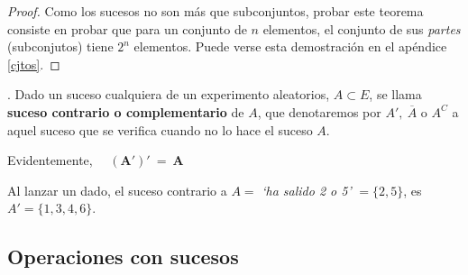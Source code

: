 \begin{proof}
Como los sucesos no son más que subconjuntos, probar este teorema consiste en probar que para un conjunto de $n$ elementos, el conjunto de sus \emph{partes} (subconjutos) tiene $2^n$ elementos. Puede verse esta demostración en el apéndice \ref{cjtos}.	
\end{proof}

\begin{definition}
.	Dado un suceso cualquiera de un experimento aleatorios, $A\subset E$, se llama \textbf{suceso contrario o complementario} de $A$, que denotaremos por $A',\ \overline{A} \text{ o } A^C$ a aquel suceso que se verifica cuando no lo hace el suceso $A$. 

\vspace{2mm} Evidentemente, $\quad \boldsymbol {(A')'\ =\ A} $

\vspace{2mm} Al lanzar un dado, el suceso contrario a $A=$ \emph{`ha salido 2 o 5'} $=\{2,5\}$, es $A'=\{1,3,4,6\}$. 
\end{definition}

\subsection{Operaciones con sucesos}

